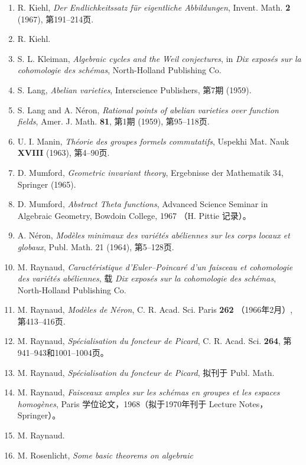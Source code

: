 \begin{enumerate}
  第589--593页.
\item[{[12]}] R. Kiehl, \emph{Der Endlichkeitssatz f\"{u}r eigentliche
  Abbildungen}, Invent. Math. \textbf{2} (1967), 第191--214页.
\item[{[13]}] R. Kiehl.
\item[{[14]}] S. L. Kleiman, \emph{Algebraic cycles and the Weil
  conjectures}, in \emph{Dix expos\'{e}s sur la cohomologie des sch\'{e}mas},
  North-Holland Publishing Co.
\item[{[15]}] S. Lang, \emph{Abelian varieties}, Interscience Publishers,
  第7期 (1959).
\item[{[16]}] S. Lang and A. N\'{e}ron, \emph{Rational points of abelian
  varieties over function fields}, Amer. J. Math. \textbf{81}, 第1期
  (1959), 第95--118页.
\item[{[16bis]}] U. I. Manin, \emph{Th\'{e}orie des groupes formels
  commutatifs}, Uspekhi Mat. Nauk \textbf{XVIII} (1963), 第4--90页.
\item[{[17]}] D. Mumford, \emph{Geometric invariant theory}, Ergebnisse
  der Mathematik 34, Springer (1965).
\item[{[18]}] D. Mumford, \emph{Abstract Theta functions}, Advanced
  Science Seminar in Algebraic Geometry, Bowdoin College, 1967 （H. Pittie 记录）。
\item[{[19]}] A. N\'{e}ron, \emph{Mod\`{e}les minimaux des vari\'{e}t\'{e}s
  ab\'{e}liennes sur les corps locaux et globaux}, Publ. Math. 21 (1964),
  第5--128页.
\item[{[20]}] M. Raynaud, \emph{Caract\'{e}ristique d'Euler--Poincar\'{e}
  d'un faisceau et cohomologie des vari\'{e}t\'{e}s ab\'{e}liennes}, 载
  \emph{Dix expos\'{e}s sur la cohomologie des sch\'{e}mas}, North-Holland
  Publishing Co.
\item[{[21]}] M. Raynaud, \emph{Mod\`{e}les de N\'{e}ron}, C. R. Acad.
  Sci. Paris \textbf{262} （1966年2月）, 第413--416页.
\item[{[22]}] M. Raynaud, \emph{Sp\'{e}cialisation du foncteur de Picard},
  C. R. Acad. Sci. \textbf{264}, 第941--943和1001--1004页。
\item[{[22bis]}] M. Raynaud, \emph{Sp\'{e}cialisation du foncteur de
  Picard}, 拟刊于 Publ. Math.
\item[{[23]}] M. Raynaud, \emph{Faisceaux amples sur les sch\'{e}mas en
  groupes et les espaces homog\`{e}nes}, Paris 学位论文，1968（拟于1970年刊于 Lecture Notes，Springer）。
\item[{[24]}] M. Raynaud.
\item[{[25]}] M. Rosenlicht, \emph{Some basic theorems on algebraic
}
\end{enumerate}
